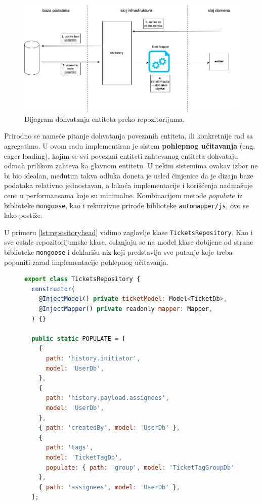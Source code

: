 \documentclass[12pt,oneside]{memoir}
\begin{document}
\begin{figure}[h]
  \centering
  \includegraphics[width=1\textwidth]{docs/images/ch_2/repository.drawio.png} 
  \caption{Dijagram dohvatanja entiteta preko repozitorijuma.}
  \label{fig:sample}
\end{figure}

Prirodno se nameće pitanje dohvatanja povezanih entiteta, ili konkretnije rad sa agregatima. U ovom radu implementiran je sistem \textbf{pohlepnog učitavanja} (eng. eager loading), kojim se svi povezani entiteti zahtevanog entiteta dohvataju odmah prilikom zahteva ka glavnom entitetu. U nekim sistemima ovakav izbor ne bi bio idealan, međutim takva odluka doneta je usled činjenice da je dizajn baze podataka relativno jednostavan, a lakoća implementacije i korišćenja nadmašuje cene u performansama koje su minimalne. Kombinacijom metode $populate$ 
 iz biblioteke \verb|mongoose|, kao i rekurzivne prirode biblioteke \verb|automapper/js|, ovo se lako postiže.

U primeru \ref{lst:repositoryhead} vidimo zaglavlje klase \verb|TicketsRepository|. Kao i sve ostale repozitorijumske klase, oslanjaju se na model klase dobijene od strane biblioteke \verb|mongoose| i deklarišu niz koji predstavlja sve putanje koje treba popuniti zarad implementacije pohlepnog učitavanja.

\begin{figure}[h]
\begin{lstlisting}[language=JavaScript, style=ES6, caption={Repozitorijum tiketa, konstrukcija i niz POPULATE.}, label={lst:repositoryhead}]
export class TicketsRepository {
  constructor(
    @InjectModel() private ticketModel: Model<TicketDb>,
    @InjectMapper() private readonly mapper: Mapper,
  ) {}

  public static POPULATE = [
    {
      path: 'history.initiator',
      model: 'UserDb',
    },
    {
      path: 'history.payload.assignees',
      model: 'UserDb',
    },
    { path: 'createdBy', model: 'UserDb' },
    {
      path: 'tags',
      model: 'TicketTagDb',
      populate: { path: 'group', model: 'TicketTagGroupDb' },
    },
    { path: 'assignees', model: 'UserDb' },
  ];
\end{lstlisting}
\end{figure}
\end{document}

